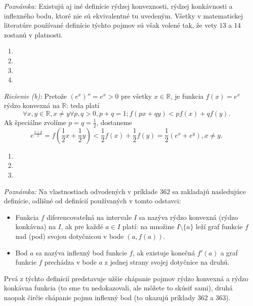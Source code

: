 \textit{Poznámka:}
Existujú aj iné definície rýdzej konvexnosti, rýdzej konkávnosti a inflexného bodu, ktoré nie sú ekvivalentné tu uvedeným. Všetky v matematickej literatúre používané definície týchto pojmov sú však volené tak, že vety $13$ a $14$ zostanú v platnosti.

\begin{enumerate}[resume]
	\item {}
	\item {}
	\item {}
	\item {}
\end{enumerate}

\textit{Riešenie (b):}
Pretože $(e^x)''=e^x>0$ pre všetky $x\in\mathbb{R}$, je funkcia $f(x)=e^x$ rýdzo konvexná na $\mathbb{R}$: teda platí
$$\forall x,y\in \mathbb{R},x\neq y \forall p,q>0,p+q=1;f(px+qy)<pf(x)+qf(y).$$
Ak špeciálne zvolíme $p=q=\frac{1}{2}$, dostaneme
$$e^{\frac{x+y}{2}}=f(\frac{1}{2}x+\frac{1}{2}y)<\frac{1}{2}f(x)+\frac{1}{2}f(y)=\frac{1}{2}(e^x+e^y),x\neq y.$$

\begin{enumerate}[resume]
	\item {}
	\item {}
	\item {}
\end{enumerate}

\textit{Poznámka:}
Na vlastnostiach odvodených v príklade $362$ sa zakladajú nasledujúce definície, odlišné od definícií používaných v tomto odstavci:
\begin{itemize}
\item Funkcia $f$ diferencovateľná na intervale $I$ sa nazýva rýdzo konvexná (rýdzo konkávna) na $I$, ak pre každé $a\in I$ platí: na množine $I \setminus \{a\}$ leží graf funkcie $f$ nad (pod) svojou dotyčnicou v bode $(a,f(a))$.
\item Bod $a$ sa nazýva inflexný bod funkcie $f$, ak existuje konečná $f'(a)$ a graf funkcie $f$ prechádza v bode $a$ z jednej strany svojej dotyčnice na druhú.
\end{itemize}
Prvá z týchto definícií predstavuje užšie chápanie pojmov rýdzo konvexná a rýdzo konkávna funkcia (to sme tu nedokazovali, ale môžete to skúsiť sami), druhá naopak čirčie chápanie pojmu inflexný bod (to ukazujú príklady $362$ a $363$).

